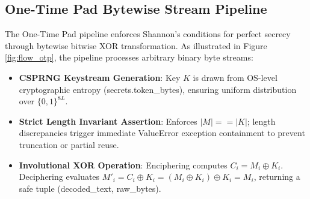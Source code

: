 \documentclass[12pt,a4paper]{report}
\renewcommand{\texttt}[1]{{\normalfont #1}}
\begin{document}
\clearpage

\subsection{One-Time Pad Bytewise Stream Pipeline}
The One-Time Pad pipeline enforces Shannon's conditions for perfect secrecy through bytewise bitwise XOR transformation. As illustrated in Figure \ref{fig:flow_otp}, the pipeline processes arbitrary binary byte streams:
\begin{itemize}[leftmargin=1.5em,topsep=1pt,itemsep=1pt,parsep=0pt]
    \item \textbf{CSPRNG Keystream Generation}: Key $K$ is drawn from OS-level cryptographic entropy (\texttt{secrets.token\_bytes}), ensuring uniform distribution over $\{0, 1\}^{8L}$.
    \item \textbf{Strict Length Invariant Assertion}: Enforces $|M| == |K|$; length discrepancies trigger immediate \texttt{ValueError} exception containment to prevent truncation or partial reuse.
    \item \textbf{Involutional XOR Operation}: Enciphering computes $C_i = M_i \oplus K_i$. Deciphering evaluates $M'_i = C_i \oplus K_i = (M_i \oplus K_i) \oplus K_i = M_i$, returning a safe tuple \texttt{(decoded\_text, raw\_bytes)}.
\end{itemize}
\end{document}
